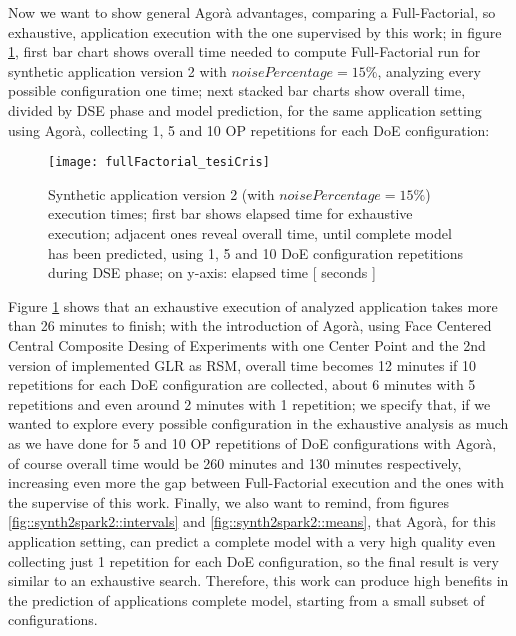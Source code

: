 Now we want to show general Agorà advantages, comparing a Full-Factorial, so exhaustive, application execution with the one supervised by this work; in figure \ref{fig::full_cris}, first bar chart shows overall time needed to compute Full-Factorial run for synthetic application version 2 with $noisePercentage = 15\%$, analyzing every possible configuration one time; next stacked bar charts show overall time, divided by DSE phase and model prediction, for the same application setting using Agorà, collecting 1, 5 and 10 OP repetitions for each DoE configuration:

\begin{figure}[H]

    \centering
    \texttt{[image: fullFactorial\_tesiCris]}
    \caption{Synthetic application version 2 (with $noisePercentage = 15\%$) execution times; first bar shows elapsed time for exhaustive execution; adjacent ones reveal overall time, until complete model has been predicted, using 1, 5 and 10 DoE configuration repetitions during DSE phase; on y-axis: elapsed time [ seconds ]}
    \label{fig::full_cris}
    
\end{figure}

Figure \ref{fig::full_cris} shows that an exhaustive execution of analyzed application takes more than 26 minutes to finish; with the introduction of Agorà, using Face Centered Central Composite Desing of Experiments with one Center Point and the 2nd version of implemented GLR as RSM, overall time becomes 12 minutes if 10 repetitions for each DoE configuration are collected, about 6 minutes with 5 repetitions and even around 2 minutes with 1 repetition; we specify that, if we wanted to explore every possible configuration in the exhaustive analysis as much as we have done for 5 and 10 OP repetitions of DoE configurations with Agorà, of course overall time would be 260 minutes and 130 minutes respectively, increasing even more the gap between Full-Factorial execution and the ones with the supervise of this work. Finally, we also want to remind, from figures \ref{fig::synth2spark2::intervals} and \ref{fig::synth2spark2::means}, that Agorà, for this application setting, can predict a complete model with a very high quality even collecting just 1 repetition for each DoE configuration, so the final result is very similar to an exhaustive search. Therefore, this work can produce high benefits in the prediction of applications complete model, starting from a small subset of configurations.


